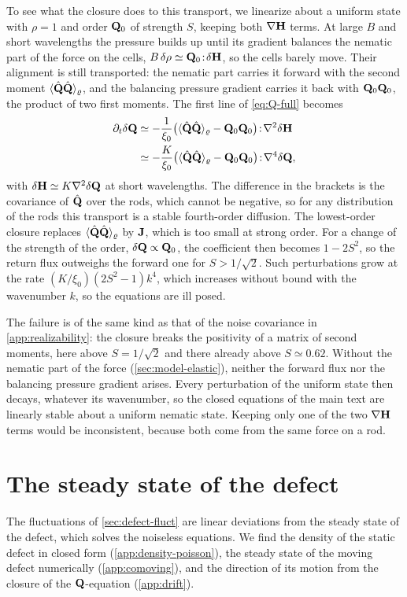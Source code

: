 \documentclass[aps,pre,reprint,superscriptaddress,longbibliography,nofootinbib
]{revtex4-2}
\begin{document}
To see what the closure does to this transport, we
linearize about a uniform state with $\rho=1$ and order
$\mathbf{Q}_0$ of strength $S$, keeping both $\nabla\mathbf{H}$ terms. At
large $B$ and short wavelengths the pressure builds up
until its gradient balances the nematic part of the force
on the cells, $B\,\delta\rho\simeq\mathbf{Q}_0\!:\!\delta\mathbf{H}$, so
the cells barely move. Their alignment is still
transported: the nematic part carries it forward with the
second moment $\langle\hat{\mathbf{Q}}\hat{\mathbf{Q}}\rangle_\varrho$, and the
balancing pressure gradient carries it back with
$\mathbf{Q}_0\mathbf{Q}_0$, the product of two first moments. The first
line of \cref{eq:Q-full} becomes
\begin{align}
  \label{eq:antidiffusion}
  \partial_t\delta\mathbf{Q}&\simeq-\frac1{\xi_0}\bigl(\langle\hat{\mathbf{Q}}\hat{\mathbf{Q}}\rangle_\varrho-\mathbf{Q}_0\mathbf{Q}_0\bigr)\!:\!\nabla^2\delta\mathbf{H}
  \nonumber\\
  &\simeq-\frac K{\xi_0}\bigl(\langle\hat{\mathbf{Q}}\hat{\mathbf{Q}}\rangle_\varrho-\mathbf{Q}_0\mathbf{Q}_0\bigr)\!:\!\nabla^4\delta\mathbf{Q} ,
\end{align}
with $\delta\mathbf{H}\simeq K\nabla^2\delta\mathbf{Q}$ at short
wavelengths. The difference in the brackets is the
covariance of $\hat{\mathbf{Q}}$ over the rods, which cannot be
negative, so for any distribution of the rods this
transport is a stable fourth-order diffusion. The
lowest-order closure replaces
$\langle\hat{\mathbf{Q}}\hat{\mathbf{Q}}\rangle_\varrho$ by $\mathbf{J}$, which is too
small at strong order. For a change of the strength of the
order, $\delta\mathbf{Q}\propto\mathbf{Q}_0$, the coefficient then becomes
$1-2S^2$, so the return flux outweighs the forward one for
$S>1/\sqrt2$. Such perturbations grow at the rate
$(K/\xi_0)(2S^2-1)k^4$, which increases without bound with
the wavenumber $k$, so the equations are ill posed.

The failure is of the same kind as that of the noise
covariance in \cref{app:realizability}: the closure breaks
the positivity of a matrix of second moments, here above
$S=1/\sqrt2$ and there already above $S\simeq0.62$. Without
the nematic part of the force (\cref{sec:model-elastic}),
neither the forward flux nor the balancing pressure
gradient arises.
Every perturbation of the uniform state then decays,
whatever its wavenumber, so the closed equations of the
main text are linearly stable about a uniform nematic
state. Keeping only one of the two $\nabla\mathbf{H}$ terms would
be inconsistent, because both come from the same force on a
rod.

\section{\texorpdfstring{The steady state of the defect}{The steady state of the defect}}
\label{app:steady}
The fluctuations of \cref{sec:defect-fluct} are linear
deviations from the steady state of the defect, which
solves the noiseless equations. We find the density of the
static defect in closed form (\cref{app:density-poisson}),
the steady state of the moving defect numerically
(\cref{app:comoving}), and the direction of its motion from
the closure of the $\mathbf{Q}$-equation (\cref{app:drift}).
\end{document}
